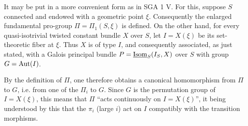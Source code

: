 It may be put in a more convenient form as in SGA 1 V. For this, suppose $S$ connected and endowed with a geometric point $\xi$. Consequently the enlarged fundamental pro-group $\Pi=\Pi_1(S,\xi)$ is defined. On the other hand, for every quasi-isotrivial twisted constant bundle $X$ over $S$, let $I=X(\xi)$ be its set-theoretic fiber at $\xi$. Thus $X$ is of type $I$, and consequently associated, as just stated, with a Galois principal bundle $P=\underline{\operatorname{Isom}}_S(I_S,X)$ over $S$ with group $G=\operatorname{Aut}(I)$.

By the definition of $\Pi$, one therefore obtains a canonical homomorphism from $\Pi$ to $G$, i.e. from one of the $\Pi_i$ to $G$. Since $G$ is the permutation group of $I=X(\xi)$, this means that $\Pi$ ``acts continuously on $I=X(\xi)$'', it being understood by this that the $\pi_i$ (large $i$) act on $I$ compatibly with the transition morphisms.

